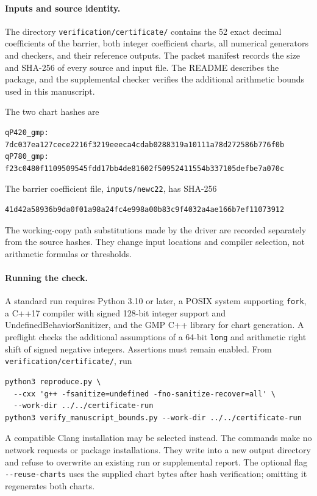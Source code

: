 \documentclass[11pt]{article}
\numberwithin{equation}{section}
\theoremstyle{definition}
\theoremstyle{remark}
\begin{document}
\paragraph{Inputs and source identity.}
The directory \texttt{verification/certificate/} contains the 52 exact decimal coefficients
of the barrier, both integer coefficient charts, all numerical generators and
checkers, and their reference outputs.  The packet manifest records the size
and SHA-256 of every source and input file.  The README describes the package,
and the supplemental checker verifies the additional arithmetic bounds used
in this manuscript.

The two chart hashes are
\begin{verbatim}
qP420_gmp:
7dc037ea127cece2216f3219eeeca4cdab0288319a10111a78d272586b776f0b
qP780_gmp:
f23c0480f1109509545fdd17bb4de81602f50952411554b337105defbe7a070c
\end{verbatim}
The barrier coefficient file, \texttt{inputs/newc22}, has SHA-256
\begin{verbatim}
41d42a58936b9da0f01a98a24fc4e998a00b83c9f4032a4ae166b7ef11073912
\end{verbatim}
The working-copy path substitutions made by the driver are recorded separately
from the source hashes.  They change input locations and compiler
selection, not arithmetic formulas or thresholds.

\paragraph{Running the check.}
A standard run requires Python 3.10 or later, a POSIX system supporting
\texttt{fork}, a C++17 compiler with signed 128-bit integer support and
UndefinedBehaviorSanitizer, and the GMP C++ library for chart generation.
A preflight checks the additional assumptions of a 64-bit \texttt{long} and
arithmetic right shift of signed negative integers.  Assertions must remain
enabled.  From \texttt{verification/certificate/}, run
\begin{verbatim}
python3 reproduce.py \
  --cxx 'g++ -fsanitize=undefined -fno-sanitize-recover=all' \
  --work-dir ../../certificate-run
python3 verify_manuscript_bounds.py --work-dir ../../certificate-run
\end{verbatim}
A compatible Clang installation may be selected instead.  The commands make no
network requests or package installations.  They write into a new output
directory and refuse to overwrite an existing run or supplemental report.
The optional flag \texttt{-{}-reuse-charts} uses the supplied chart bytes after
hash verification; omitting it regenerates both charts.
\end{document}

